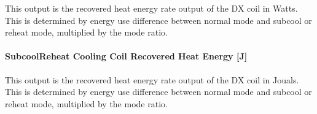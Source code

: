 This output is the recovered heat energy rate output of the DX coil in Watts. This is determined by energy use difference between normal mode and subcool or reheat mode, multiplied by the mode ratio.

\paragraph{SubcoolReheat Cooling Coil Recovered Heat Energy {[}J{]}}\label{subcoolreheat-cooling-coil-recovered-heat-energy-j}

This output is the recovered heat energy rate output of the DX coil in Jouals. This is determined by energy use difference between normal mode and subcool or reheat mode, multiplied by the mode ratio.

